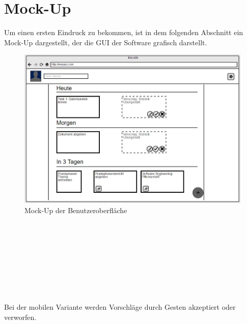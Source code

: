 
\chapter{Mock-Up}
Um einen ersten Eindruck zu bekommen, ist in dem folgenden Abschnitt ein Mock-Up dargestellt, der die GUI der Software grafisch darstellt.\\

\begin{figure}[H]
\centering
\includegraphics[scale=0.6]{images/mock-up}
\caption{Mock-Up der Benutzeroberfläche}
\end{figure}

\ \\
\ \\
\ \\
\ \\

\ \\
\ \\

\ \\
\ \\



Bei der mobilen Variante werden Vorschläge durch Gesten akzeptiert oder verworfen. \\

